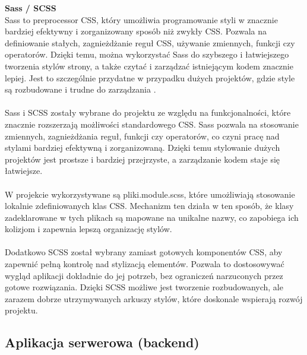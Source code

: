 \documentclass[twoside]{projektInzynierskiMS1}
\begin{document}
\noindent \textbf{Sass / SCSS}\\
Sass to preprocessor CSS, który umożliwia programowanie styli w znacznie bardziej efektywny i zorganizowany sposób niż zwykły CSS. Pozwala na definiowanie stałych, zagnieżdżanie reguł CSS, używanie zmiennych, funkcji czy operatorów. Dzięki temu, można wykorzystać Sass do szybszego i łatwiejszego tworzenia stylów strony, a także czytać i zarządzać istniejącym kodem znacznie lepiej. Jest to szczególnie przydatne w przypadku dużych projektów, gdzie style są rozbudowane i trudne do zarządzania \cite{BoringOwlSass}.
\\\\
Sass i SCSS zostały wybrane do projektu ze względu na funkcjonalności, które znacznie rozszerzają możliwości standardowego CSS. Sass pozwala na stosowanie zmiennych, zagnieżdżania reguł, funkcji czy operatorów, co czyni pracę nad stylami bardziej efektywną i zorganizowaną. Dzięki temu stylowanie dużych projektów jest prostsze i bardziej przejrzyste, a zarządzanie kodem staje się łatwiejsze.
\\\\
W projekcie wykorzystywane są pliki.module.scss, które umożliwiają stosowanie lokalnie zdefiniowanych klas CSS. Mechanizm ten działa w ten sposób, że klasy zadeklarowane w tych plikach są mapowane na unikalne nazwy, co zapobiega ich kolizjom i zapewnia lepszą organizację stylów.
\\\\
Dodatkowo SCSS został wybrany zamiast gotowych komponentów CSS, aby zapewnić pełną kontrolę nad stylizacją elementów. Pozwala to dostosowywać wygląd aplikacji dokładnie do jej potrzeb, bez ograniczeń narzuconych przez gotowe rozwiązania. Dzięki SCSS możliwe jest tworzenie rozbudowanych, ale zarazem dobrze utrzymywanych arkuszy stylów, które doskonale wspierają rozwój projektu.

\newpage

\subsection{Aplikacja serwerowa (backend)}
\end{document}
